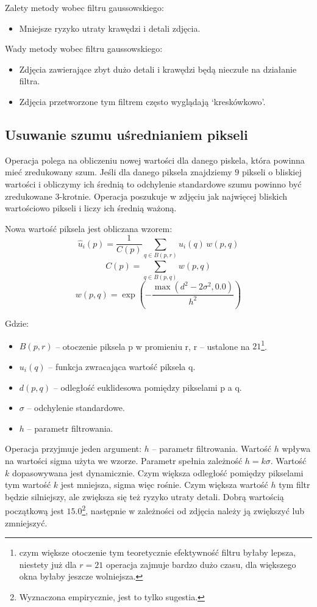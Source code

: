 \documentclass[]{mwart}
\begin{document}
Zalety metody wobec filtru gaussowskiego:
\begin{itemize}
    \item Mniejsze ryzyko utraty krawędzi i detali zdjęcia.
\end{itemize}

Wady metody wobec filtru gaussowskiego:
\begin{itemize}
    \item Zdjęcia zawierające zbyt dużo detali i krawędzi będą nieczułe na działanie filtra.
    \item Zdjęcia przetworzone tym filtrem często wyglądają `kreskówkowo'.
\end{itemize}


\subsection{Usuwanie szumu uśrednianiem pikseli}
Operacja polega na obliczeniu nowej wartości dla danego piskela, która powinna mieć
zredukowany szum. Jeśli dla danego piksela znajdziemy $9$ pikseli o bliskiej wartości i obliczymy
ich średnią to odchylenie standardowe szumu powinno być zredukowane $3$-krotnie. Operacja
poszukuje w zdjęciu jak najwięcej bliskich wartościowo pikseli i liczy ich średnią ważoną.

Nowa wartość piksela jest obliczana wzorem:
\[ \hat{u}_i(p) = \frac{1}{C(p)} \sum_{q \in B(p, r)} u_i(q) \, w(p, q)\]
\[ C(p) = \sum_{q \in B(p,q)}^{}w(p,q) \]
\[ w(p,q) = \exp(-\frac{\max (d^2-2\sigma^2, 0.0)}{h^2})\]

Gdzie:
\begin{itemize}
    \item $B(p,r)$ -- otoczenie piksela p w promieniu r, r -- ustalone na $21$\footnote{czym większe otoczenie tym teoretycznie efektywność filtru byłaby lepsza, niestety już dla $r=21$ operacja zajmuje bardzo dużo czasu, dla większego okna byłaby jeszcze wolniejsza.}.
    \item $u_i(q)$ -- funkcja zwracająca wartość piksela q.
    \item $d(p, q)$ -- odległość euklidesowa pomiędzy pikselami p a q.
    \item $\sigma$ -- odchylenie standardowe.
    \item $h$ -- parametr filtrowania.
\end{itemize}

Operacja przyjmuje jeden argument: $h$ -- parametr filtrowania.
Wartość $h$ wpływa na wartości sigma użyta we wzorze.
Parametr spełnia zależność $h = k\sigma$. Wartość $k$ dopasowywana jest dynamicznie. Czym
większa odległość pomiędzy pikselami tym wartość $k$ jest mniejsza, sigma więc rośnie.
Czym większa wartość $h$ tym filtr będzie silniejszy, ale zwiększa się też ryzyko utraty detali.
Dobrą wartością początkową jest $15.0$\footnote{Wyznaczona empirycznie, jest to tylko sugestia.}, następnie w zależności od zdjęcia należy ją zwiększyć lub
zmniejszyć. \newline
\end{document}
